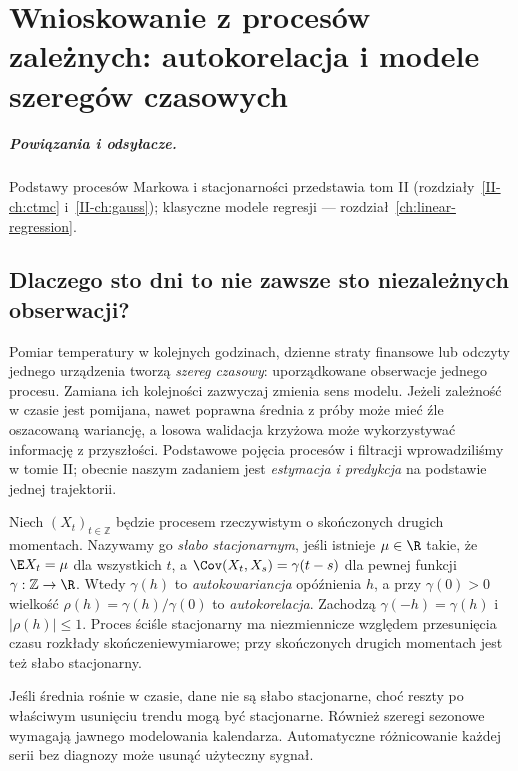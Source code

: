 \chapter{Wnioskowanie z procesów zależnych: autokorelacja i modele szeregów czasowych}
\label{ch:time-series}
\paragraph{Powiązania i odsyłacze.} Podstawy procesów Markowa i stacjonarności przedstawia tom II (rozdziały~\ref{II-ch:ctmc} i~\ref{II-ch:gauss}); klasyczne modele regresji — rozdział~\ref{ch:linear-regression}.


\section{Dlaczego sto dni to nie zawsze sto niezależnych obserwacji?}
Pomiar temperatury w kolejnych godzinach, dzienne straty
finansowe lub odczyty jednego urządzenia tworzą \emph{szereg czasowy}:
uporządkowane obserwacje jednego procesu. Zamiana ich kolejności
zazwyczaj zmienia sens modelu. Jeżeli zależność w czasie jest
pomijana, nawet poprawna średnia z próby może mieć źle oszacowaną
wariancję, a losowa walidacja krzyżowa może wykorzystywać
informację z przyszłości. Podstawowe pojęcia procesów i
filtracji wprowadziliśmy w tomie II; obecnie naszym zadaniem
jest \emph{estymacja i predykcja} na podstawie jednej trajektorii.

\begin{definicja}
\label{def:weak-stationarity}
Niech $(X_t)_{t\in\mathbb Z}$ będzie procesem rzeczywistym
o skończonych drugich momentach. Nazywamy go \emph{słabo
stacjonarnym}, jeśli istnieje $\mu\in\R$ takie, że
$\E X_t=\mu$ dla wszystkich $t$, a
$\Cov(X_t,X_s)=\gamma(t-s)$ dla pewnej funkcji
$\gamma:\mathbb Z\to\R$. Wtedy $\gamma(h)$ to
\emph{autokowariancja} opóźnienia $h$, a przy
$\gamma(0)>0$ wielkość $\rho(h)=\gamma(h)/\gamma(0)$
to \emph{autokorelacja}. Zachodzą $\gamma(-h)=\gamma(h)$
i $|\rho(h)|\le1$. Proces ściśle stacjonarny ma
niezmiennicze względem przesunięcia czasu rozkłady
skończeniewymiarowe; przy skończonych drugich momentach
jest też słabo stacjonarny.
\end{definicja}

\begin{uwaga}
Jeśli średnia rośnie w czasie, dane nie są słabo
stacjonarne, choć reszty po właściwym usunięciu trendu
mogą być stacjonarne. Również szeregi sezonowe wymagają
jawnego modelowania kalendarza. Automatyczne różnicowanie
każdej serii bez diagnozy może usunąć użyteczny sygnał.
\end{uwaga}

